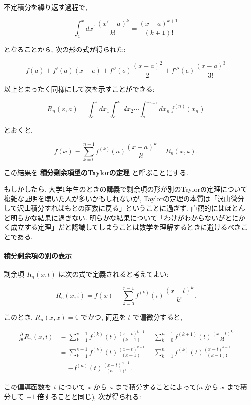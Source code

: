 \documentclass[10pt, a4paper,xelatex,ja=standard]{bxjsarticle}
\begin{document}
不定積分を繰り返す過程で,

\[
\int_a^x dx'\,\frac{(x' - a)^k}{k!} =
\frac{(x - a)^{k+1}}{(k+1)!}
\]

となることから, 次の形の式が得られた:

\[
f(a) + f'(a)(x - a) + f''(a)\frac{(x - a)^2}{2} + f'''(a)\frac{(x - a)^3}{3!}
\]

以上とまったく同様にして次を示すことができる:

\[
R_n(x, a) = \int_a^x dx_1\int_a^{x_1}dx_2\cdots\int_a^{x_{n-1}}dx_n\, f^{(n)}(x_n)
\]

とおくと,

\[
f(x) = \sum_{k=0}^{n-1} f^{(k)}(a)\frac{(x-a)^k}{k!} + R_n(x,a).
\]

この結果を \textbf{積分剰余項型のTaylorの定理} と呼ぶことにする.

もしかしたら,
大学1年生のときの講義で剰余項の形が別のTaylorの定理について複雑な証明を聴いた人が多いかもしれないが,
Taylorの定理の本質は「沢山微分して沢山積分すればもとの函数に戻る」ということに過ぎず,
直観的にはほとんど明らかな結果に過ぎない.
明らかな結果について「わけがわからないがとにかく成立する定理」だと認識してしまうことは数学を理解するときに避けるべきことである.

    \hypertarget{ux7a4dux5206ux5270ux4f59ux9805ux306eux5225ux306eux8868ux793a}{%
\paragraph{積分剰余項の別の表示}\label{ux7a4dux5206ux5270ux4f59ux9805ux306eux5225ux306eux8868ux793a}}

剰余項 \(R_n(x,t)\) は次の式で定義されると考えてよい:

\[
R_n(x,t) = f(x) - \sum_{k=0}^{n-1} f^{(k)}(t)\frac{(x-t)^k}{k!}.
\]

このとき, \(R_n(x,x)=0\) でかつ, 両辺を \(t\) で偏微分すると,

\[
\begin{aligned}
\frac{\partial}{\partial t}R_n(x,t) &=
\sum_{k=1}^{n-1} f^{(k)}(t)\frac{(x-t)^{k-1}}{(k-1)!} -
\sum_{k=0}^{n-1} f^{(k+1)}(t)\frac{(x-t)^k}{k!}
\\ &=
\sum_{k=1}^{n-1} f^{(k)}(t)\frac{(x-t)^{k-1}}{(k-1)!} -
\sum_{k=1}^{n} f^{(k)}(t)\frac{(x-t)^{k-1}}{(k-1)!}
\\ &= -
f^{(n)}(t)\frac{(x-t)^{n-1}}{(n-1)!}.
\end{aligned}
\]

この偏導函数を \(t\) について \(x\) から \(a\)
まで積分することによって(\(a\) から \(x\) まで積分して \(-1\)
倍することと同じ), 次が得られる:
\end{document}
